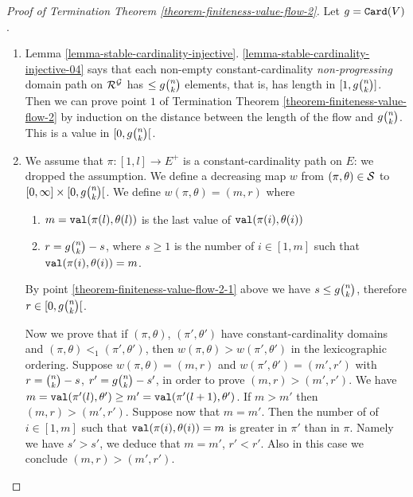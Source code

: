 \documentclass{lmcs}
\begin{document}
\begin{proof}
[Proof of Termination Theorem \ref{theorem-finiteness-value-flow-2}]
Let $g = {\tt Card}(V)$.

\begin{enumerate}

\item
Lemma \ref{lemma-stable-cardinality-injective}.
\ref{lemma-stable-cardinality-injective-04} says that 
each non-empty 
constant-cardinality \emph{non-progressing} domain path on ${\mathcal R}^{\mathcal G}$
has $\le g\newton{n}{k}$ elements, that is, has
length in $[1,  g\newton{n}{k}]$. Then we can prove
point $1$ of Termination Theorem \ref{theorem-finiteness-value-flow-2}
by induction on the distance between the length of the flow and
$g\newton{n}{k}$. 
This is a value in $[0,g\newton{n}{k}[$.

\item
We assume that $\pi:[1,l] \rightarrow E^+$ is a constant-cardinality
path on $E$: we dropped the  assumption. 
We define a decreasing map $w$ from
$(\pi,\theta) \in {\mathcal S}$ to $[0,\infty] \times[0,  g\newton{n}{k}[$.
We define $w(\pi,\theta) = (m,r)$ where 
\begin{enumerate}
\item
$m = {\tt val}(\pi(l),\theta(l))$ is the last value of ${\tt val}(\pi(i),\theta(i))$ 
\item
$r = g\newton{n}{k} - s$, 
where $s \ge 1$ is the number of $i \in[1,m]$ 
such that ${\tt val}(\pi(i),\theta(i)) = m$.
\end{enumerate}
By point \ref{theorem-finiteness-value-flow-2-1} 
above we have $s \le g\newton{n}{k}$,
therefore $r \in [0, g\newton{n}{k}[$.

Now we prove that if $(\pi,\theta)$, $(\pi',\theta')$ have constant-cardinality
domains and $(\pi,\theta) <_1 (\pi',\theta')$, then $w(\pi,\theta) >
w(\pi',\theta')$ in the lexicographic ordering. Suppose $w(\pi,\theta) = (m,r)$
and $w(\pi',\theta') = (m',r')$ with $r = \newton{n}{k} - s$,
$r' = g\newton{n}{k} - s'$, in order to prove $(m,r) > (m',r')$.
We have $m = {\tt val}(\pi'(l),\theta') \ge m' = {\tt val}(\pi'(l+1),\theta')$.
If $m > m'$ then $(m,r) > (m',r')$. Suppose now that $m=m'$.
Then the number of of $i \in[1,m]$ such that ${\tt val}(\pi(i),\theta(i)) = m$
is greater in $\pi'$ than in $\pi$. Namely we have $s' > s'$, we deduce that
$m=m'$, $r' < r'$. Also in this case we conclude $(m,r) > (m',r')$. 


\end{enumerate}
\end{proof}
\end{document}
